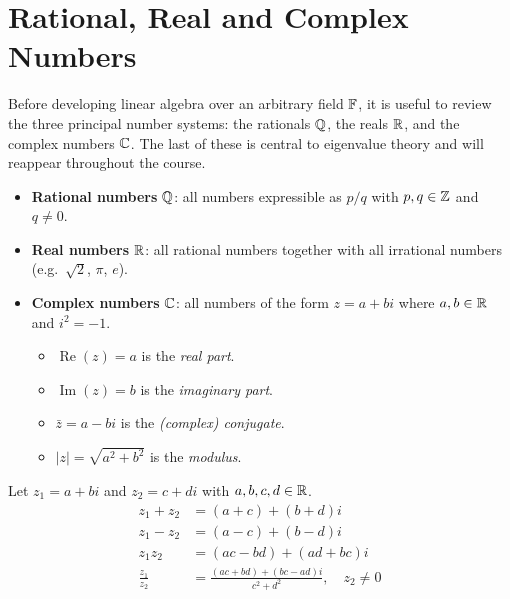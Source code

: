 \section{Rational, Real and Complex Numbers}

Before developing linear algebra over an arbitrary field $\mathbb{F}$, it is useful to
review the three principal number systems: the rationals $\mathbb{Q}$, the reals $\mathbb{R}$,
and the complex numbers $\mathbb{C}$.  The last of these is central to eigenvalue
theory and will reappear throughout the course.

\begin{defbox}
\begin{itemize}
    \item \textbf{Rational numbers} $\mathbb{Q}$: all numbers expressible as $p/q$ with
          $p,q\in\mathbb{Z}$ and $q\neq 0$.
    \item \textbf{Real numbers} $\mathbb{R}$: all rational numbers together with all
          irrational numbers (e.g.\ $\sqrt{2}$, $\pi$, $e$).
    \item \textbf{Complex numbers} $\mathbb{C}$: all numbers of the form $z = a+bi$
          where $a,b\in\mathbb{R}$ and $i^2=-1$.
          \begin{itemize}
              \item $\operatorname{Re}(z) = a$ is the \emph{real part}.
              \item $\operatorname{Im}(z) = b$ is the \emph{imaginary part}.
              \item $\bar{z} = a-bi$ is the \emph{(complex) conjugate}.
              \item $|z| = \sqrt{a^2+b^2}$ is the \emph{modulus}.
          \end{itemize}
\end{itemize}
\end{defbox}

\begin{defbox}
Let $z_1 = a+bi$ and $z_2 = c+di$ with $a,b,c,d\in\mathbb{R}$.
\begin{align*}
    z_1 + z_2 &= (a+c)+(b+d)i \\
    z_1 - z_2 &= (a-c)+(b-d)i \\
    z_1 z_2   &= (ac-bd)+(ad+bc)i \\
    \frac{z_1}{z_2} &= \frac{(ac+bd)+(bc-ad)i}{c^2+d^2}, \quad z_2\neq 0
\end{align*}
\end{defbox}

